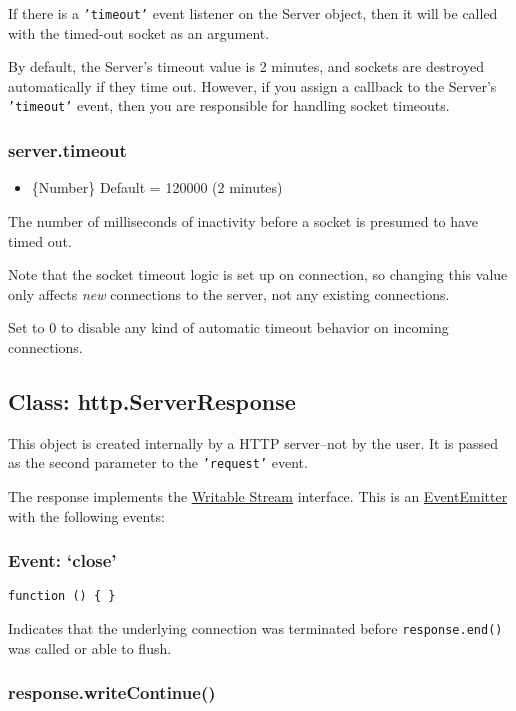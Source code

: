 If there is a \texttt{'timeout'} event listener on the Server object,
then it will be called with the timed-out socket as an argument.

By default, the Server's timeout value is 2 minutes, and sockets are
destroyed automatically if they time out. However, if you assign a
callback to the Server's \texttt{'timeout'} event, then you are
responsible for handling socket timeouts.

\subsubsection{server.timeout}

\begin{itemize}
\item
  \{Number\} Default = 120000 (2 minutes)
\end{itemize}

The number of milliseconds of inactivity before a socket is presumed to
have timed out.

Note that the socket timeout logic is set up on connection, so changing
this value only affects \emph{new} connections to the server, not any
existing connections.

Set to 0 to disable any kind of automatic timeout behavior on incoming
connections.

\subsection{Class: http.ServerResponse}

This object is created internally by a HTTP server--not by the user. It
is passed as the second parameter to the \texttt{'request'} event.

The response implements the
\href{stream.html\#stream\_writable\_stream}{Writable Stream} interface.
This is an
\href{events.html\#events\_class\_events\_eventemitter}{EventEmitter}
with the following events:

\subsubsection{Event: `close'}

\texttt{function () \{ \}}

Indicates that the underlying connection was terminated before
\texttt{response.end()} was called or able to flush.

\subsubsection{response.writeContinue()}


